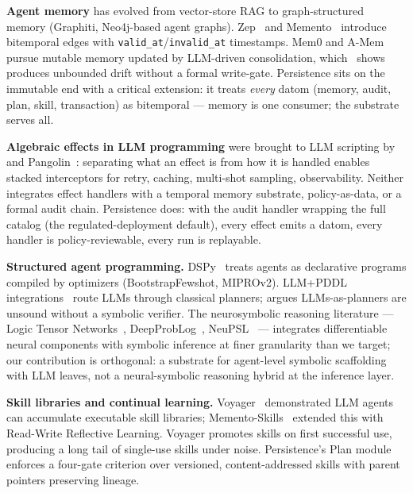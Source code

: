 \documentclass[anon]{nesy2026}   %
\newcommand{\C}[1]{\texttt{#1}}
\begin{document}
\textbf{Agent memory}\label{sec:memory} has evolved from vector-store RAG to graph-structured memory (Graphiti, Neo4j-based agent graphs). Zep~\citep{kurtic2025zep} and Memento~\citep{n1n2026memento} introduce bitemporal edges with \C{valid\_at}/\C{invalid\_at} timestamps. Mem0 and A-Mem pursue mutable memory updated by LLM-driven consolidation, which~\citet{hannecke2026ssgm} shows produces unbounded drift without a formal write-gate. Persistence sits on the immutable end with a critical extension: it treats \emph{every} datom (memory, audit, plan, skill, transaction) as bitemporal --- memory is one consumer; the substrate serves all.

\textbf{Algebraic effects in LLM programming}\label{sec:effects-rw} were brought to LLM scripting by~\citet{wang2025composable} and Pangolin~\citep{cheng2025pangolin}: separating what an effect is from how it is handled enables stacked interceptors for retry, caching, multi-shot sampling, observability. Neither integrates effect handlers with a temporal memory substrate, policy-as-data, or a formal audit chain. Persistence does: with the audit handler wrapping the full catalog (the regulated-deployment default), every effect emits a datom, every handler is policy-reviewable, every run is replayable.

\textbf{Structured agent programming.}\label{sec:structured} DSPy~\citep{khattab2023dspy} treats agents as declarative programs compiled by optimizers (BootstrapFewshot, MIPROv2). LLM+PDDL integrations~\citep{liu2023llmp,valmeekam2023planbench} route LLMs through classical planners; \citet{kambhampati2024canllm} argues LLMs-as-planners are unsound without a symbolic verifier. The neurosymbolic reasoning literature --- Logic Tensor Networks~\citep{badreddine2022ltn}, DeepProbLog~\citep{manhaeve2018deepproblog}, NeuPSL~\citep{pryor2023neupsl} --- integrates differentiable neural components with symbolic inference at finer granularity than we target; our contribution is orthogonal: a substrate for agent-level symbolic scaffolding with LLM leaves, not a neural-symbolic reasoning hybrid at the inference layer.

\textbf{Skill libraries and continual learning.}\label{sec:skills} Voyager~\citep{wang2023voyager} demonstrated LLM agents can accumulate executable skill libraries; Memento-Skills~\citep{memento2026skills} extended this with Read-Write Reflective Learning. Voyager promotes skills on first successful use, producing a long tail of single-use skills under noise. Persistence's Plan module enforces a four-gate criterion over versioned, content-addressed skills with parent pointers preserving lineage.
\end{document}

